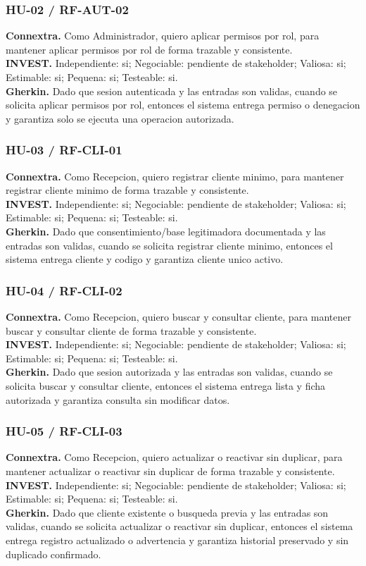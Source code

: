 \documentclass[11pt,a4paper,twoside]{article}
\begin{document}
\subsubsection{HU-02 / RF-AUT-02}
\textbf{Connextra.} Como Administrador, quiero aplicar permisos por rol, para mantener aplicar permisos por rol de forma trazable y consistente.\\
\textbf{INVEST.} Independiente: si; Negociable: pendiente de stakeholder; Valiosa: si; Estimable: si; Pequena: si; Testeable: si.\\
\textbf{Gherkin.} Dado que sesion autenticada y las entradas son validas, cuando se solicita aplicar permisos por rol, entonces el sistema entrega permiso o denegacion y garantiza solo se ejecuta una operacion autorizada.

\subsubsection{HU-03 / RF-CLI-01}
\textbf{Connextra.} Como Recepcion, quiero registrar cliente minimo, para mantener registrar cliente minimo de forma trazable y consistente.\\
\textbf{INVEST.} Independiente: si; Negociable: pendiente de stakeholder; Valiosa: si; Estimable: si; Pequena: si; Testeable: si.\\
\textbf{Gherkin.} Dado que consentimiento/base legitimadora documentada y las entradas son validas, cuando se solicita registrar cliente minimo, entonces el sistema entrega cliente y codigo y garantiza cliente unico activo.

\subsubsection{HU-04 / RF-CLI-02}
\textbf{Connextra.} Como Recepcion, quiero buscar y consultar cliente, para mantener buscar y consultar cliente de forma trazable y consistente.\\
\textbf{INVEST.} Independiente: si; Negociable: pendiente de stakeholder; Valiosa: si; Estimable: si; Pequena: si; Testeable: si.\\
\textbf{Gherkin.} Dado que sesion autorizada y las entradas son validas, cuando se solicita buscar y consultar cliente, entonces el sistema entrega lista y ficha autorizada y garantiza consulta sin modificar datos.

\subsubsection{HU-05 / RF-CLI-03}
\textbf{Connextra.} Como Recepcion, quiero actualizar o reactivar sin duplicar, para mantener actualizar o reactivar sin duplicar de forma trazable y consistente.\\
\textbf{INVEST.} Independiente: si; Negociable: pendiente de stakeholder; Valiosa: si; Estimable: si; Pequena: si; Testeable: si.\\
\textbf{Gherkin.} Dado que cliente existente o busqueda previa y las entradas son validas, cuando se solicita actualizar o reactivar sin duplicar, entonces el sistema entrega registro actualizado o advertencia y garantiza historial preservado y sin duplicado confirmado.
\end{document}
